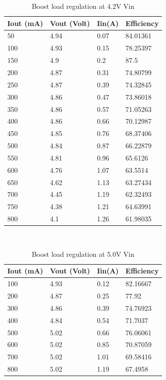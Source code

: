 \begin{table}[H]
\centering
\begin{tabular}{|l|l|l|l|}
\hline
Iout (mA) & Vout (Volt) & Iin(A) & Efficiency \\ \hline
50        & 4.94        & 0.07   & 84.01361   \\ \hline
100       & 4.93        & 0.15   & 78.25397   \\ \hline
150       & 4.9         & 0.2    & 87.5       \\ \hline
200       & 4.87        & 0.31   & 74.80799   \\ \hline
250       & 4.87        & 0.39   & 74.32845   \\ \hline
300       & 4.86        & 0.47   & 73.86018   \\ \hline
350       & 4.86        & 0.57   & 71.05263   \\ \hline
400       & 4.86        & 0.66   & 70.12987   \\ \hline
450       & 4.85        & 0.76   & 68.37406   \\ \hline
500       & 4.84        & 0.87   & 66.22879   \\ \hline
550       & 4.81        & 0.96   & 65.6126    \\ \hline
600       & 4.76        & 1.07   & 63.5514    \\ \hline
650       & 4.62        & 1.13   & 63.27434   \\ \hline
700       & 4.45        & 1.19   & 62.32493   \\ \hline
750       & 4.38        & 1.21   & 64.63991   \\ \hline
800       & 4.1         & 1.26   & 61.98035   \\ \hline
\end{tabular}
\caption{Boost load regulation at 4.2V Vin}
\label{table:4}
\end{table}
\\ 
\begin{table}[H]
\centering
\begin{tabular}{|l|l|l|l|}
\hline
Iout (mA) & Vout (Volt) & Iin(A) & Efficiency \\ \hline
100       & 4.93        & 0.12   & 82.16667   \\ \hline
200       & 4.87        & 0.25   & 77.92      \\ \hline
300       & 4.86        & 0.39   & 74.76923   \\ \hline
400       & 4.84        & 0.54   & 71.7037    \\ \hline
500       & 5.02        & 0.66   & 76.06061   \\ \hline
600       & 5.02        & 0.85   & 70.87059   \\ \hline
700       & 5.02        & 1.01   & 69.58416   \\ \hline
800       & 5.02        & 1.19   & 67.4958    \\ \hline
\end{tabular}
\caption{Boost load regulation at 5.0V Vin}
\label{table:4}
\end{table}
